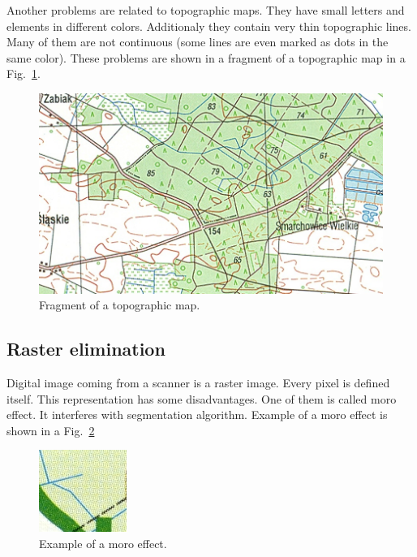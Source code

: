 \documentclass[a4paper,onecolumn,oneside,12pt]{memoir}
\begin{document}
Another problems are related to topographic maps. They have small letters and elements in different
colors. Additionaly they contain very thin topographic lines. Many of them are not continuous
 (some lines are even marked as dots in the same color). These problems are shown in a fragment of a
topographic map in a Fig.~\ref{topographicMapExample}.

\begin{figure}[!ht]
\begin{center}
\includegraphics[scale=2.0]{images/topographicMapExample.jpg}
\caption{Fragment of a topographic map.}
\label{topographicMapExample}
\end{center}
\end{figure}

\subsection{Raster elimination}

Digital image coming from a scanner is a raster image. Every pixel is defined itself. This
representation has some disadvantages. One of them is called moro effect. It interferes with
segmentation algorithm. Example of a moro effect is shown in a Fig.~\ref{moroEffectExample}

\begin{figure}[!ht]
\begin{center}
\includegraphics[scale=11.0]{images/moroEffectExample.jpg}
\caption{Example of a moro effect.}
\label{moroEffectExample}
\end{center}
\end{figure}
\end{document}
